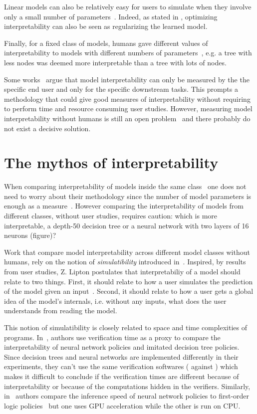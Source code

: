 Linear models can also be relatively easy for users to simulate when they involve only a small number of parameters~\cite{study-4}.
Indeed, as stated in \cite{study-0}, optimizing interpretability can also be seen as regularizing the learned model. 

Finally, for a fixed class of models, humans gave different values of interpretability to models with different numbers of parameters~\cite{study-4}, e.g. a tree with less nodes was deemed more interpretable than a tree with lots of nodes.

Some works~\cite{lipton,rigourous} argue that model interpretability can only be measured by the the specific end user and only for the specific downstream tasks.
This prompts a methodology that could give good measures of interpretability without requiring to perform time and resource consuming user studies.
However, measuring model interpretability without humans is still an open problem~\cite{glanois-survey} and there probably do not exist a decisive solution.

\section{The mythos of interpretability}\label{res:lipton}
When comparing interpretability of models inside the same class~\cite{murtree,blossom,pystreed,vanderlinden2024optimalgreedydecisiontrees,sympol,viper,topin2021iterative} one does not need to worry about their methodology since the number of model parameters is enough as a measure~\cite{study-4}.
However comparing the interpretability of models from different classes, without user studies, requires caution: which is more interpretable, a depth-50 decision tree or a neural network with two layers of 16 neurons (figure)?

Work that compare model interpretability across different model classes without humans, rely on the notion of \textit{simulatibility} introduced in~\cite{lipton}.
Inspired, by results from user studies, Z. Lipton postulates that interpretabiliy of a model should relate to two things.
First, it should relate to how a user simulates the prediction of the model given an input~\cite{study-6,study-5}.
Second, it should relate to how a user gets a global idea of the model's internals, i.e. without any inputs, what does the user understands from reading the model.

This notion of simulatibility is closely related to space and time complexities of programs.
In~\cite{viper}, authors use verification time as a proxy to compare the interpretability of neural network policies and imitated decision tree policies.
Since decision trees and neural networks are implemented differently in their experiments, they can't use the same verification softwares (\cite{z3} against \cite{maraboupy}) which makes it difficult to conclude if the verification times are different because of interpretability or because of the computations hidden in the verifiers.
Similarly, in~\cite{insight} authors compare the inference speed of neural network policies to first-order logic policies~\cite{nudge} but one uses GPU acceleration while the other is run on CPU.

